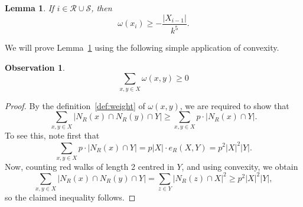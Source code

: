 \documentclass[12pt,reqno]{amsart}
\newtheorem{lemma}[theorem]{Lemma}
\newtheorem{obs}[theorem]{Observation}
\theoremstyle{definition}
\theoremstyle{remark}
\def\cS{\mathcal{S}}
\renewcommand{\ge}{\geqslant}
\def\cR{\mathcal{R}}
\begin{document}

\begin{lemma}\label{lem:weight:bound}
If\/ $i \in \cR \cup \cS$, then
$$\omega(x_i) \ge - \frac{|X_{i-1}|}{k^5}.$$
\end{lemma}


We will prove Lemma~\ref{lem:weight:bound} using the following simple application of convexity. 

\begin{obs}\label{obs:weights}
\begin{equation} 
\sum_{x,y \in X} \omega(x,y) \ge 0 
\end{equation}
\end{obs}

\begin{proof}
By the definition~\eqref{def:weight} of $\omega(x,y)$, we are required to show that
$$\sum_{x,y \in X} |N_R(x) \cap N_R(y) \cap Y| \ge \sum_{x,y \in X} p \cdot |N_R(x) \cap Y|.$$
To see this, note first that 
$$\sum_{x,y \in X} p \cdot |N_R(x) \cap Y| = p |X| \cdot e_R(X,Y) = p^2 |X|^2 |Y|.$$
Now, counting red walks of length 2 centred in $Y$, and using convexity, %
we obtain
$$\sum_{x,y \in X} |N_R(x) \cap N_R(y) \cap Y| = \sum_{z \in Y} |N_R(z) \cap X|^2 \ge p^2 |X|^2 |Y|,$$
so the claimed inequality follows.  
\end{proof} 



\end{document}
